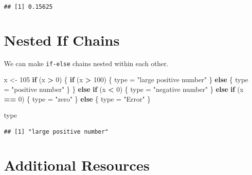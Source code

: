 \documentclass[
]{book}
\newenvironment{Shaded}{\begin{snugshade}}{\end{snugshade}}
\newcommand{\ControlFlowTok}[1]{\textcolor[rgb]{0.13,0.29,0.53}{\textbf{#1}}}
\newcommand{\DecValTok}[1]{\textcolor[rgb]{0.00,0.00,0.81}{#1}}
\newcommand{\NormalTok}[1]{#1}
\newcommand{\OperatorTok}[1]{\textcolor[rgb]{0.81,0.36,0.00}{\textbf{#1}}}
\newcommand{\StringTok}[1]{\textcolor[rgb]{0.31,0.60,0.02}{#1}}
\begin{document}
\begin{verbatim}
## [1] 0.15625
\end{verbatim}

\hypertarget{nested-if-chains}{%
\section{Nested If Chains}\label{nested-if-chains}}

We can make \texttt{if-else} chains nested within each other.

\begin{Shaded}
\begin{Highlighting}[]
\NormalTok{x <-}\StringTok{ }\DecValTok{105}
\ControlFlowTok{if}\NormalTok{ (x }\OperatorTok{>}\StringTok{ }\DecValTok{0}\NormalTok{) \{}
    \ControlFlowTok{if}\NormalTok{ (x }\OperatorTok{>}\StringTok{ }\DecValTok{100}\NormalTok{) \{}
\NormalTok{        type =}\StringTok{ "large positive number"}
\NormalTok{    \} }\ControlFlowTok{else}\NormalTok{ \{}
\NormalTok{        type =}\StringTok{ "positive number"}
\NormalTok{    \}}
\NormalTok{\} }\ControlFlowTok{else} \ControlFlowTok{if}\NormalTok{ (x }\OperatorTok{<}\StringTok{ }\DecValTok{0}\NormalTok{) \{}
\NormalTok{    type =}\StringTok{ "negative number"}
\NormalTok{\} }\ControlFlowTok{else} \ControlFlowTok{if}\NormalTok{ (x }\OperatorTok{==}\StringTok{ }\DecValTok{0}\NormalTok{) \{}
\NormalTok{    type =}\StringTok{ "zero"}
\NormalTok{\} }\ControlFlowTok{else}\NormalTok{ \{}
\NormalTok{    type =}\StringTok{ "Error"}
\NormalTok{\}}

\NormalTok{type}
\end{Highlighting}
\end{Shaded}

\begin{verbatim}
## [1] "large positive number"
\end{verbatim}

\hypertarget{additional-resources-4}{%
\section*{Additional Resources}\label{additional-resources-4}}
\end{document}
